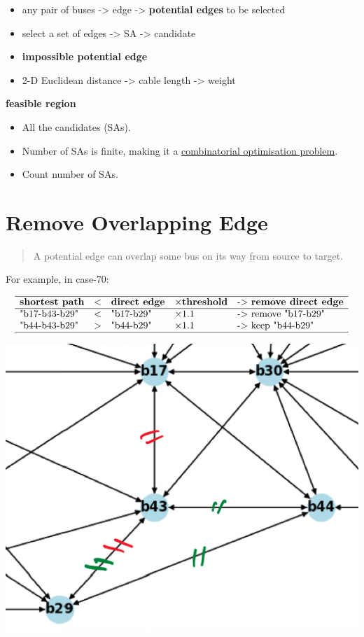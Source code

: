 \documentclass[
]{book}
\providecommand{\tightlist}{%
  \setlength{\itemsep}{0pt}\setlength{\parskip}{0pt}}
\begin{document}
\begin{itemize}
\tightlist
\item
  any pair of buses -\textgreater{} edge -\textgreater{} \textbf{potential edges} to be selected
\item
  select a set of edges -\textgreater{} SA -\textgreater{} candidate
\item
  \textbf{impossible potential edge}
\item
  2-D Euclidean distance -\textgreater{} cable length -\textgreater{} weight
\end{itemize}

\textbf{feasible region}

\begin{itemize}
\tightlist
\item
  All the candidates (SAs).
\item
  Number of SAs is finite, making it a \protect\hyperlink{combinatorial}{combinatorial
  optimisation problem}.
\item
  Count number of SAs.
\end{itemize}

\hypertarget{overlapping}{%
\section{Remove Overlapping Edge}\label{overlapping}}

\begin{quote}
A potential edge can overlap some bus on its way from source to target.
\end{quote}

For example, in case-70:

\[
\begin{array}{lllll}
  \hline
  \textbf{shortest path} & <
  & \textbf{direct edge} & \times \textbf{threshold}
  & \text{-> } \textbf{remove direct edge} \\
  \hline
  \text{"b17‐b43-b29"} & < & \text{"b17-b29"} & \times 1.1
  & \text{-> remove "b17-b29"} \\
  \text{"b44‐b43-b29"} & > & \text{"b44-b29"} & \times 1.1
  & \text{-> keep "b44-b29"} \\
  \hline
\end{array}
\]

\begin{center}\includegraphics[width=0.6\linewidth]{Pictures/overlapGeth} \end{center}
\end{document}
